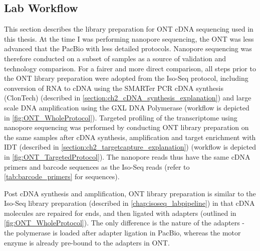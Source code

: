 \clearpage
\subsection{Lab Workflow}
\label{chap:ont_labpipeline}
This section describes the library preparation for ONT cDNA sequencing used in this thesis. At the time I was performing nanopore sequencing, the ONT was less advanced that the PacBio with less detailed protocols. Nanopore sequencing was therefore conducted on a subset of samples as a source of validation and technology comparison. For a fairer and more direct comparison, all steps prior to the ONT library preparation were adopted from the Iso-Seq protocol, including conversion of RNA to cDNA using the SMARTer PCR cDNA synthesis (ClonTech) (described in \cref{section:ch2_cDNA_synthesis_explanation}) and large scale DNA amplification using the GXL DNA Polymerase (workflow is depicted in \cref{fig:ONT_WholeProtocol}). Targeted profiling of the transcriptome using nanopore sequencing was performed by conducting ONT library preparation on the same samples after cDNA synthesis, amplification and target enrichment with IDT (described in \cref{section:ch2_targetcapture_explanation}) (workflow is depicted in \cref{fig:ONT_TargetedProtocol}). The nanopore reads thus have the same cDNA primers and barcode sequences as the Iso-Seq reads (refer to \cref{tab:barcode_primers} for sequences).   

Post cDNA synthesis and amplification, ONT library preparation is similar to the Iso-Seq library preparation  (described in \cref{chap:isoseq_labpipeline}) in that cDNA molecules are repaired for ends, and then ligated with adapters (outlined in \cref{fig:ONT_WholeProtocol}). The only difference is the nature of the adapters - the polymerase is loaded after adapter ligation in PacBio, whereas the motor enzyme is already pre-bound to the adapters in ONT. 

